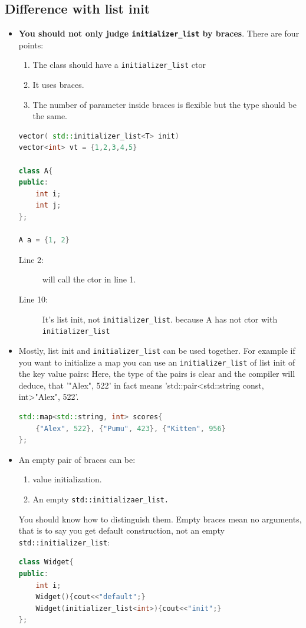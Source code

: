 \documentclass[a4paper,11pt,twoside]{book}
\begin{document}
\subsection{Difference with list init}
\begin{itemize}
	\item  \textbf{You should not only judge \texttt{initializer\_list} by braces}. There are four points:
	\begin{enumerate}
		\item The class should have a \texttt{initializer\_list} ctor 
		\item It uses braces.
		\item The number of parameter inside braces is flexible but the type should be the same.
	\end{enumerate}

\begin{lstlisting}[frame=single, language=c++,mathescape=true]
vector( std::initializer_list<T> init)
vector<int> vt = {1,2,3,4,5}  
	
class A{
public:
	int i;
	int j;
};
	
A a = {1, 2} 
\end{lstlisting}

\begin{description}
	\item[Line 2:] will call the ctor in line 1.
	\item[Line 10:] It's list init, not \texttt{initializer\_list}. because A has not ctor with \texttt{initializer\_list}
\end{description}
	
	\item Mostly, list init and \texttt{initializer\_list} can be used together. For example if you want to initialize a map you can use an \texttt{initializer\_list} of list init of the key value pairs: Here, the type of the pairs is clear and the compiler will deduce, that '{"Alex", 522}' in fact means 'std::pair<std::string const, int>{"Alex", 522}'.
	
\begin{lstlisting}[frame=single, language=c++,mathescape=true]
std::map<std::string, int> scores{ 
	{"Alex", 522}, {"Pumu", 423}, {"Kitten", 956} 
};
\end{lstlisting}

	\item An empty pair of braces can be:
	\begin{enumerate}
		\item value initialization.
		\item An empty \texttt{std::initializaer\_list.}
	\end{enumerate}
	You should know how to distinguish them.  Empty braces mean no arguments, that is to say you get default construction, not an empty \texttt{std::initializer\_list}:
\begin{lstlisting}[frame=single, language=c++,mathescape=true]
class Widget{
public:
	int i;
	Widget(){cout<<"default";}
	Widget(initializer_list<int>){cout<<"init";}
};
	

\end{lstlisting}
\end{itemize}
\end{document}

